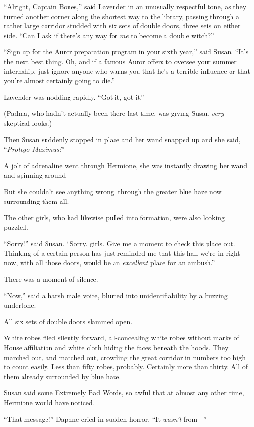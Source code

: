 ``Alright, Captain Bones,'' said Lavender in an unusually respectful tone, as they turned another corner along the shortest way to the library, passing through a rather large corridor studded with six sets of double doors, three sets on either side. ``Can I ask if there's any way for \emph{me} to become a double witch?''

``Sign up for the Auror preparation program in your sixth year,'' said Susan. ``It's the next best thing. Oh, and if a famous Auror offers to oversee your summer internship, just ignore anyone who warns you that he's a terrible influence or that you're almost certainly going to die.''

Lavender was nodding rapidly. ``Got it, got it.''

(Padma, who hadn't actually been there last time, was giving Susan \emph{very} skeptical looks.)

Then Susan suddenly stopped in place and her wand snapped up and she said, ``\emph{Protego Maximus!}''

A jolt of adrenaline went through Hermione, she was instantly drawing her wand and spinning around -

But she couldn't see anything wrong, through the greater blue haze now surrounding them all.

The other girls, who had likewise pulled into formation, were also looking puzzled.

``Sorry!'' said Susan. ``Sorry, girls. Give me a moment to check this place out. Thinking of a certain person has just reminded me that this hall we're in right now, with all those doors, would be an \emph{excellent} place for an ambush.''

There was a moment of silence.

``Now,'' said a harsh male voice, blurred into unidentifiability by a buzzing undertone.

All six sets of double doors slammed open.

White robes filed silently forward, all-concealing white robes without marks of House affiliation and white cloth hiding the faces beneath the hoods. They marched out, and marched out, crowding the great corridor in numbers too high to count easily. Less than fifty robes, probably. Certainly more than thirty. All of them already surrounded by blue haze.

Susan said some Extremely Bad Words, so awful that at almost any other time, Hermione would have noticed.

``That message!'' Daphne cried in sudden horror. ``It \emph{wasn't} from~-''

